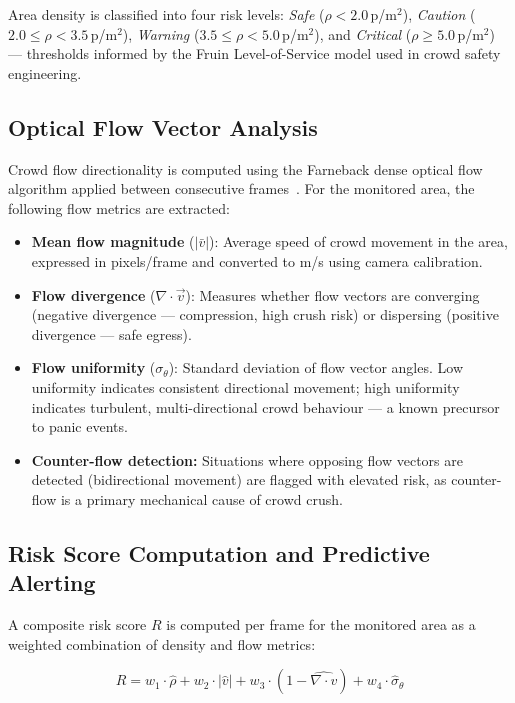 \documentclass[12pt,a4paper]{article}
\begin{document}
Area density is classified into four risk levels: \textit{Safe} ($\rho < 2.0$\,p/m$^2$), \textit{Caution} ($2.0 \leq \rho < 3.5$\,p/m$^2$), \textit{Warning} ($3.5 \leq \rho < 5.0$\,p/m$^2$), and \textit{Critical} ($\rho \geq 5.0$\,p/m$^2$) — thresholds informed by the Fruin Level-of-Service model used in crowd safety engineering.

\subsection{Optical Flow Vector Analysis}

Crowd flow directionality is computed using the Farneback dense optical flow algorithm applied between consecutive frames~\cite{farneback_2025}. For the monitored area, the following flow metrics are extracted:

\begin{itemize}[leftmargin=1.5em, itemsep=3pt]
  \item \textbf{Mean flow magnitude} ($|\bar{v}|$): Average speed of crowd movement in the area, expressed in pixels/frame and converted to m/s using camera calibration.
  \item \textbf{Flow divergence} ($\nabla \cdot \vec{v}$): Measures whether flow vectors are converging (negative divergence — compression, high crush risk) or dispersing (positive divergence — safe egress).
  \item \textbf{Flow uniformity} ($\sigma_\theta$): Standard deviation of flow vector angles. Low uniformity indicates consistent directional movement; high uniformity indicates turbulent, multi-directional crowd behaviour — a known precursor to panic events.
  \item \textbf{Counter-flow detection:} Situations where opposing flow vectors are detected (bidirectional movement) are flagged with elevated risk, as counter-flow is a primary mechanical cause of crowd crush.
\end{itemize}

\subsection{Risk Score Computation and Predictive Alerting}

A composite risk score $R$ is computed per frame for the monitored area as a weighted combination of density and flow metrics:

\[
R = w_1 \cdot \hat{\rho} + w_2 \cdot |\hat{v}| + w_3 \cdot (1 - \widehat{\nabla \cdot v}) + w_4 \cdot \hat{\sigma}_\theta
\]
\end{document}
